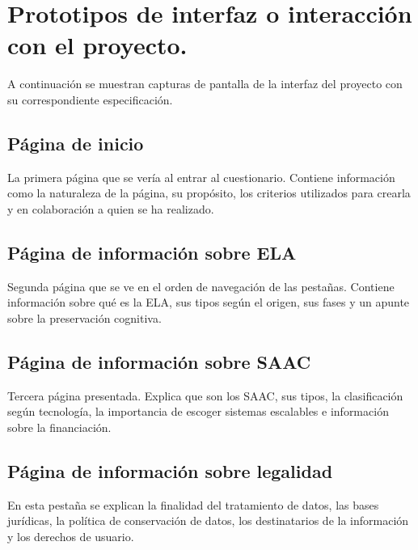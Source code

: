 \section{Prototipos de interfaz o interacción con el proyecto.}
A continuación se muestran capturas de pantalla de la interfaz del proyecto con su correspondiente especificación.

\subsection{Página de inicio}
La primera página que se vería al entrar al cuestionario. Contiene información como la naturaleza de la página, su propósito, los criterios utilizados para crearla y en colaboración a quien se ha realizado.


\subsection{Página de información sobre ELA}
Segunda página que se ve en el orden de navegación de las pestañas. Contiene información sobre qué es la ELA, sus tipos según el origen, sus fases y un apunte sobre la preservación cognitiva.


\subsection{Página de información sobre SAAC}
Tercera página presentada. Explica que son los SAAC, sus tipos, la clasificación según tecnología, la importancia de escoger sistemas escalables e información sobre la financiación.


\subsection{Página de información sobre legalidad}
En esta pestaña se explican la finalidad del tratamiento de datos, las bases jurídicas, la política de conservación de datos, los destinatarios de la información y los derechos de usuario.

